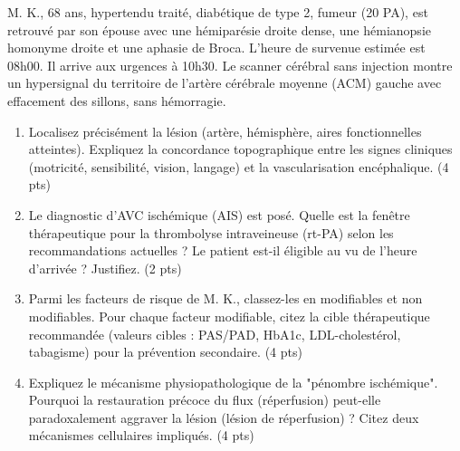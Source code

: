 \documentclass[11pt]{article}
\begin{document}
\begin{exercice}
M. K., 68 ans, hypertendu traité, diabétique de type 2, fumeur (20 PA), est retrouvé par son épouse avec une hémiparésie droite dense, une hémianopsie homonyme droite et une aphasie de Broca. L'heure de survenue estimée est 08h00. Il arrive aux urgences à 10h30. Le scanner cérébral sans injection montre un hypersignal du territoire de l'artère cérébrale moyenne (ACM) gauche avec effacement des sillons, sans hémorragie.
\begin{enumerate}
    \item Localisez précisément la lésion (artère, hémisphère, aires fonctionnelles atteintes). Expliquez la concordance topographique entre les signes cliniques (motricité, sensibilité, vision, langage) et la vascularisation encéphalique. (4 pts)
    \item Le diagnostic d'AVC ischémique (AIS) est posé. Quelle est la fenêtre thérapeutique pour la thrombolyse intraveineuse (rt-PA) selon les recommandations actuelles ? Le patient est-il éligible au vu de l'heure d'arrivée ? Justifiez. (2 pts)
    \item Parmi les facteurs de risque de M. K., classez-les en modifiables et non modifiables. Pour chaque facteur modifiable, citez la cible thérapeutique recommandée (valeurs cibles : PAS/PAD, HbA1c, LDL-cholestérol, tabagisme) pour la prévention secondaire. (4 pts)
    \item Expliquez le mécanisme physiopathologique de la "pénombre ischémique". Pourquoi la restauration précoce du flux (réperfusion) peut-elle paradoxalement aggraver la lésion (lésion de réperfusion) ? Citez deux mécanismes cellulaires impliqués. (4 pts)
\end{enumerate}
\end{exercice}
\end{document}
